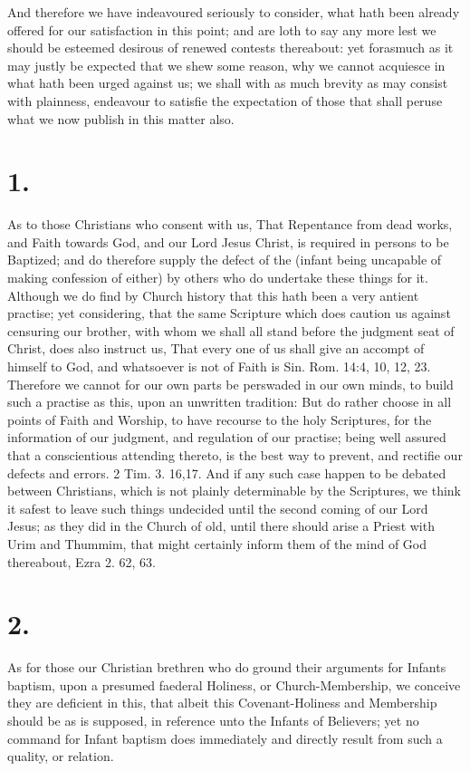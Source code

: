 \documentclass[12pt,a4paper]{book}
\begin{document}
And therefore we have indeavoured seriously to consider, what hath been already offered for our satisfaction in this point; and are loth to say any more lest we should be esteemed desirous of renewed contests thereabout: yet forasmuch as it may justly be expected that we shew some reason, why we cannot acquiesce in what hath been urged against us; we shall with as much brevity as may consist with plainness, endeavour to satisfie the expectation of those that shall peruse what we now publish in this matter also.

\section{1.}
As to those Christians who consent with us, That Repentance from dead works, and Faith towards God, and our Lord Jesus Christ, is required in persons to be Baptized; and do therefore supply the defect of the (infant being uncapable of making confession of either) by others who do undertake these things for it. Although we do find by Church history that this hath been a very antient practise; yet considering, that the same Scripture which does caution us against censuring our brother, with whom we shall all stand before the judgment seat of Christ, does also instruct us, That every one of us shall give an accompt of himself to God, and whatsoever is not of Faith is Sin. Rom. 14:4, 10, 12, 23. Therefore we cannot for our own parts be perswaded in our own minds, to build such a practise as this, upon an unwritten tradition: But do rather choose in all points of Faith and Worship, to have recourse to the holy Scriptures, for the information of our judgment, and regulation of our practise; being well assured that a conscientious attending thereto, is the best way to prevent, and rectifie our defects and errors. 2 Tim. 3. 16,17. And if any such case happen to be debated between Christians, which is not plainly determinable by the Scriptures, we think it safest to leave such things undecided until the second coming of our Lord Jesus; as they did in the Church of old, until there should arise a Priest with Urim and Thummim, that might certainly inform them of the mind of God thereabout, Ezra 2. 62, 63.

\section{2.}
As for those our Christian brethren who do ground their arguments for Infants baptism, upon a presumed faederal Holiness, or Church-Membership, we conceive they are deficient in this, that albeit this Covenant-Holiness and Membership should be as is supposed, in reference unto the Infants of Believers; yet no command for Infant baptism does immediately and directly result from such a quality, or relation.
\end{document}
